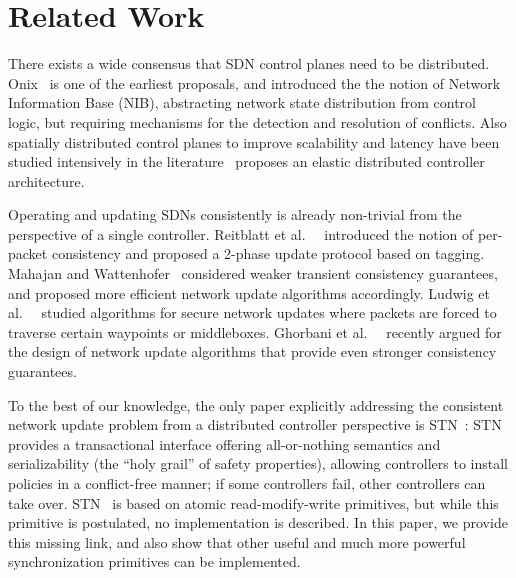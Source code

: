 \documentclass[conference]{sigcomm-alternate}
\begin{document}
\begin{comment}
\section{The Practical Implementation}\label{sec:extension}

\end{comment}

\section{Related Work}\label{sec:relwork}

There exists a wide consensus that SDN control planes need to be distributed.~\cite{onos,onix,elasticon}
Onix~\cite{onix} is one of the earliest proposals, and introduced the
the notion of Network Information Base (NIB), abstracting network state
distribution from control logic, but
requiring mechanisms for the detection and resolution of conflicts.
Also spatially distributed control planes to improve scalability and
latency have been studied intensively
in the literature~\cite{kandoo,ctrl-place,hotsdn13loc}
proposes an elastic distributed controller architecture.

Operating and updating SDNs consistently is already non-trivial
from the perspective of a single controller. Reitblatt et al.~~\cite{network-update}
introduced the notion of
per-packet consistency and proposed a 2-phase update protocol based on tagging.
Mahajan and Wattenhofer~\cite{roger-hotnets} considered weaker transient
consistency guarantees, and proposed more efficient network update algorithms
accordingly. Ludwig et al.~~\cite{hotnets14update} studied algorithms for secure
network updates where packets are forced to traverse certain waypoints or
middleboxes. Ghorbani et al.~~\cite{correct-virt} recently argued for the design
of network update algorithms that provide even stronger consistency guarantees.

To the best of our knowledge, the only paper explicitly addressing the consistent
network update problem from a distributed controller perspective is STN~\cite{stn}:
STN provides a transactional interface offering all-or-nothing semantics and serializability
(the ``holy grail'' of safety properties),
allowing
controllers to install policies in a conflict-free manner; if some controllers fail,
other controllers can take over. STN~\cite{stn} is based on
atomic
read-modify-write primitives, but while this primitive is postulated, no implementation is
described. In this paper, we provide this missing link, and also show that other useful and
much more powerful synchronization primitives can be implemented.
\end{document}
